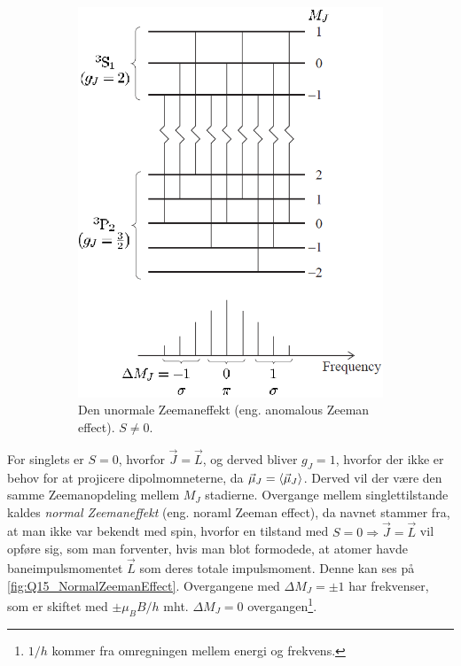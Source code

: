 \begin{figure}[!h]
\begin{subfigure}[t]{0.46\textwidth}
        \includegraphics[width=\columnwidth]{Q15/images/AnomalousZeemanEffect.PNG}
        \caption{Den unormale Zeemaneffekt (eng. anomalous Zeeman effect). $S \ne 0$.}
        \label{fig:Q15_AnomalousZeemanEffect}
    \end{subfigure}
    \caption{}
    \label{fig:Q15_TypesOfZeemanEffect}
\end{figure}

For singlets er $S = 0$, hvorfor $\Vec{J} = \Vec{L}$, og derved bliver $g_J = 1$, hvorfor der ikke er behov for at projicere dipolmomneterne, da $\Vec{\mu}_J = \Braket{\Vec{\mu}_J}$. Derved vil der være den samme Zeemanopdeling mellem $M_J$ stadierne. Overgange mellem singlettilstande kaldes \emph{normal Zeemaneffekt} (eng. noraml Zeeman effect), da navnet stammer fra, at man ikke var bekendt med spin, hvorfor en tilstand med $S = 0 \Rightarrow \Vec{J} = \Vec{L}$ vil opføre sig, som man forventer, hvis man blot formodede, at atomer havde baneimpulsmomentet $\Vec{L}$ som deres totale impulsmoment. Denne kan ses på \cref{fig:Q15_NormalZeemanEffect}. Overgangene med $\Delta M_J = \pm 1$ har frekvenser, som er skiftet med $\pm \mu_B B / h$ mht. $\Delta M_J = 0$ overgangen\footnote{$1/h$ kommer fra omregningen mellem energi og frekvens.}.

